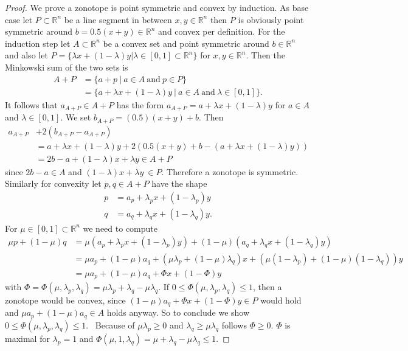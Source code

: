 \documentclass{article}
\theoremstyle{definition}
\begin{document}
\begin{proof}
We prove a zonotope is point symmetric and convex by induction. As base case let $P \subset \mathbb{R}^{n}$ be a line segment in between $x, y \in \mathbb{R}^{n}$ then $P$ is obviously point symmetric around $b=0.5(x+y) \in \mathbb{R}^{n}$ and convex per definition. For the induction step let $A \subset \mathbb{R}^{n}$ be a convex set and point symmetric around $b \in \mathbb{R}^{n}$ and also let $P = \{ \lambda x + (1- \lambda) y | \lambda \in [0,1] \subset \mathbb{R}^{n} \}$ for $x, y \in \mathbb{R}^{n}$. Then the Minkowski sum of the two sets is
\begin{align*}
A + P 
&= \{ a + p \ | \ a \in A \ \text{and} \ p \in P \} \\
&= \{ a + \lambda x + (1- \lambda) y \ | \ a \in A \ \text{and} \ \lambda \in [0,1] \}.
\end{align*}
It follows that $a_{A+P} \in A+P$ has the form $a_{A+P}=a + \lambda x + (1- \lambda)y$ for $a\in A$ and $\lambda \in [0,1]$. We set $b_{A+P}=(0.5)(x+y) + b$. Then
\begin{align*}
a_{A+P} &+ 2(b_{A+P} - a_{A+P}) \\
&= a + \lambda x + (1- \lambda)y + 2( 0.5(x+y) + b - (a + \lambda x + (1-\lambda)y)) \\
&= 2b-a + (1- \lambda) x + \lambda y \in A+P
\end{align*}
since $2b-a \in A$ and $(1- \lambda) x + \lambda y \ \in P$. Therefore a zonotope is symmetric.
Similarly for convexity let $p, q \in A+P$ have the shape
\begin{align*}
p &= a_{p} + \lambda_{p} x + (1 - \lambda_{p}) y \\
q &= a_{q} + \lambda_{q} x + (1 - \lambda_{q}) y.
\end{align*}
For $\mu \in [0, 1] \subset \mathbb{R}^{n}$ we need to compute
\begin{align*}
\mu p + (1 - \mu) q &= \mu (a_{p} + \lambda_{p} x + (1-\lambda_{p}) y) + (1-\mu)(a_{q} + \lambda_{q} x + (1-\lambda_{q}) y) \\
&= \mu a_{p} + (1-\mu) a_{q} + (\mu \lambda_{p} + (1-\mu)\lambda_{q})x + (\mu(1-\lambda_{p}) + (1-\mu)(1-\lambda_{q}))y \\
&= \mu a_{p} + (1-\mu) a_{q} + \Phi x + (1- \Phi) y
\end{align*}
with $\Phi = \Phi(\mu , \lambda_{p}, \lambda_{q}) = \mu \lambda_{p} + \lambda_{q} - \mu \lambda_{q}$. If $0 \leq \Phi (\mu, \lambda_{p}, \lambda_{q}) \leq 1$, then a zonotope would be convex, since $(1-\mu) a_{q} + \Phi x + (1- \Phi) y \in P$ would hold and $\mu a_{p} + (1-\mu) a_{q} \in A$ holds anyway. So to conclude we show $0 \leq \Phi (\mu, \lambda_{p}, \lambda_{q}) \leq 1$. \
Because of $\mu \lambda_{p} \geq 0$ and $\lambda_{q} \geq \mu \lambda_{q}$ follows $\Phi \geq 0$. $\Phi$ is maximal for $\lambda_{p} = 1$ and $\Phi (\mu, 1, \lambda_{q}) = \mu + \lambda_{q} - \mu \lambda_{q} \leq 1$.
\end{proof}
\end{document}
